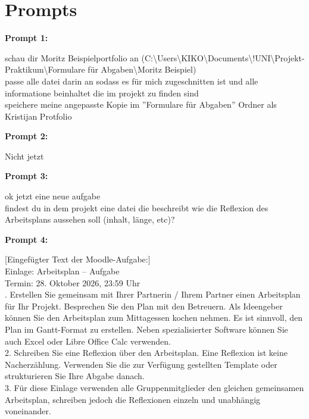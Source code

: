 \section*{Prompts}
{\small

\par\medskip\noindent\textbf{Prompt 1:}\\
{\ttfamily\raggedright
schau dir Moritz Beispielportfolio an (C:\textbackslash{}Users\textbackslash{}KIKO\textbackslash{}Documents\textbackslash{}!UNI\textbackslash{}Projekt-Praktikum\textbackslash{}Formulare für Abgaben\textbackslash{}Moritz Beispiel)\\
\smallskip
passe alle datei darin an sodass es für mich zugeschnitten ist und alle informatione beinhaltet die im projekt zu finden sind\\
speichere meine angepasste Kopie im ''Formulare für Abgaben'' Ordner als Kristijan Protfolio\\
}
\par\medskip\noindent\textbf{Prompt 2:}\\
{\ttfamily\raggedright
Nicht jetzt\\
}
\par\medskip\noindent\textbf{Prompt 3:}\\
{\ttfamily\raggedright
ok jetzt eine neue aufgabe\\
findest du in dem projekt eine datei die beschreibt wie die Reflexion des Arbeitsplans aussehen soll (inhalt, länge, etc)?\\
}
\par\medskip\noindent\textbf{Prompt 4:}\\
{\ttfamily\raggedright
{[}Eingefügter Text der Moodle-Aufgabe:{]}\\
Einlage: Arbeitsplan – Aufgabe\\
Termin: 28. Oktober 2026, 23:59 Uhr\\
. Erstellen Sie gemeinsam mit Ihrer Partnerin / Ihrem Partner einen Arbeitsplan für Ihr Projekt. Besprechen Sie den Plan mit den Betreuern. Als Ideengeber können Sie den Arbeitsplan zum Mittagessen kochen nehmen. Es ist sinnvoll, den Plan im Gantt-Format zu erstellen. Neben spezialisierter Software können Sie auch Excel oder Libre Office Calc verwenden.\\
2. Schreiben Sie eine Reflexion über den Arbeitsplan. Eine Reflexion ist keine Nacherzählung. Verwenden Sie die zur Verfügung gestellten Template oder strukturieren Sie Ihre Abgabe danach.\\
3. Für diese Einlage verwenden alle Gruppenmitglieder den gleichen gemeinsamen Arbeitsplan, schreiben jedoch die Reflexionen einzeln und unabhängig voneinander.\\
}}
